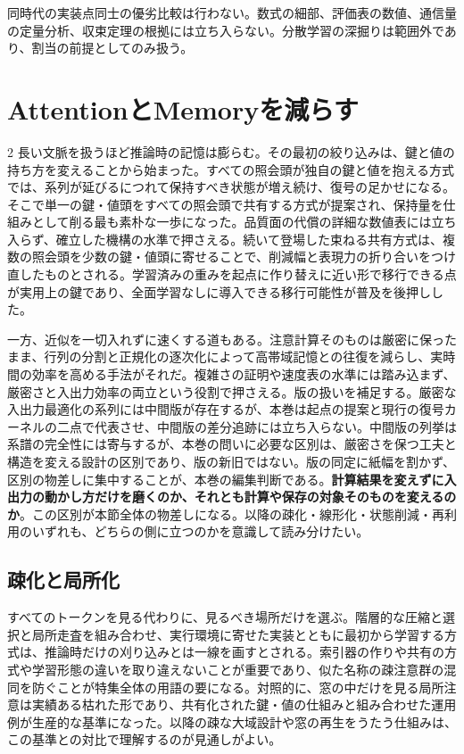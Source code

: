 \documentclass[lualatex,a4paper,10pt]{jlreq}
\begin{document}
\begin{claimboundary}[本節の読解上の境界]
同時代の実装点同士の優劣比較は行わない。数式の細部、評価表の数値、通信量の定量分析、収束定理の根拠には立ち入らない。分散学習の深掘りは範囲外であり、割当の前提としてのみ扱う。
\end{claimboundary}

\section{AttentionとMemoryを減らす}
\label{sec:attention}

\begin{multicols}{2}
\raggedcolumns
長い文脈を扱うほど推論時の記憶は膨らむ。その最初の絞り込みは、鍵と値の持ち方を変えることから始まった。すべての照会頭が独自の鍵と値を抱える方式では、系列が延びるにつれて保持すべき状態が増え続け、復号の足かせになる。そこで単一の鍵・値頭をすべての照会頭で共有する方式が提案され、保持量を仕組みとして削る最も素朴な一歩になった\autocite{mqa}。品質面の代償の詳細な数値表には立ち入らず、確立した機構の水準で押さえる。続いて登場した束ねる共有方式は、複数の照会頭を少数の鍵・値頭に寄せることで、削減幅と表現力の折り合いをつけ直したものとされる\autocite{gqa}。学習済みの重みを起点に作り替えに近い形で移行できる点が実用上の鍵であり、全面学習なしに導入できる移行可能性が普及を後押しした。

一方、近似を一切入れずに速くする道もある。注意計算そのものは厳密に保ったまま、行列の分割と正規化の逐次化によって高帯域記憶との往復を減らし、実時間の効率を高める手法がそれだ\autocite{flashattn}。複雑さの証明や速度表の水準には踏み込まず、厳密さと入出力効率の両立という役割で押さえる。版の扱いを補足する。厳密な入出力最適化の系列には中間版が存在するが、本巻は起点の提案と現行の復号カーネルの二点で代表させ、中間版の差分追跡には立ち入らない。中間版の列挙は系譜の完全性には寄与するが、本巻の問いに必要な区別は、厳密さを保つ工夫と構造を変える設計の区別であり、版の新旧ではない。版の同定に紙幅を割かず、区別の物差しに集中することが、本巻の編集判断である。\textbf{計算結果を変えずに入出力の動かし方だけを磨くのか、それとも計算や保存の対象そのものを変えるのか}。この区別が本節全体の物差しになる。以降の疎化・線形化・状態削減・再利用のいずれも、どちらの側に立つのかを意識して読み分けたい。

\subsection{疎化と局所化}
すべてのトークンを見る代わりに、見るべき場所だけを選ぶ。階層的な圧縮と選択と局所走査を組み合わせ、実行環境に寄せた実装とともに最初から学習する方式は、推論時だけの刈り込みとは一線を画すとされる\autocite{nsa}。索引器の作りや共有の方式や学習形態の違いを取り違えないことが重要であり、似た名称の疎注意群の混同を防ぐことが特集全体の用語の要になる。対照的に、窓の中だけを見る局所注意は実績ある枯れた形であり、共有化された鍵・値の仕組みと組み合わせた運用例が生産的な基準になった\autocite{mistral7b}。以降の疎な大域設計や窓の再生をうたう仕組みは、この基準との対比で理解するのが見通しがよい。


\end{multicols}
\end{document}
